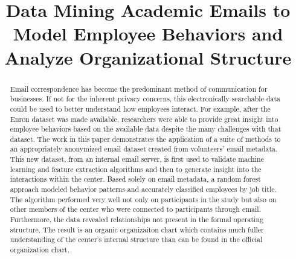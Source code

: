 \documentclass[10pt,twocolumn,conference]{IEEEtran}
\begin{document}
    
\setlength\belowdisplayskip{1.5pt}
\setlength\abovedisplayskip{1.5pt}
\allowdisplaybreaks

	\sloppy
    
    \title{Data Mining Academic Emails to Model Employee Behaviors and Analyze Organizational Structure\vspace{-7.5pt}}
    \author{
        \vspace{-25pt} }
    
\maketitle

\begin{abstract}
Email correspondence has become the predominant method of communication for businesses.
If not for the inherent privacy concerns, this electronically searchable data could be used to better understand how employees interact.
For example, after the Enron dataset was made available, researchers were able to provide great insight into employee behaviors based on the available data despite the many challenges with that dataset.
The work in this paper demonstrates the application of a suite of methods to an appropriately anonymized email dataset created from volunteers' email metadata.
This new dataset, from an internal email server, is first used to validate machine learning and feature extraction algorithms and then to generate insight into the interactions within the center.
Based solely on email metadata, a random forest approach modeled behavior patterns and accurately classified employees by job title.
The algorithm performed very well not only on participants in the study but also on other members of the center who were connected to participants through email.
Furthermore, the data revealed relationships not present in the formal operating structure.
The result is an organic organizaiton chart which contains much fuller understanding of the center's internal structure than can be found in the official organization chart.
\end{abstract}
\end{document}
